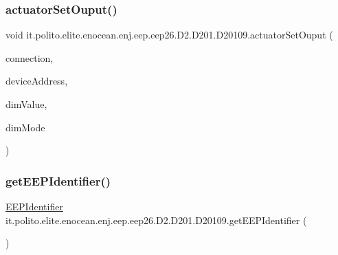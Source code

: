 \hypertarget{classit_1_1polito_1_1elite_1_1enocean_1_1enj_1_1eep_1_1eep26_1_1_d2_1_1_d201_1_1_d20109_a098e695e37eff327a11a08085113d75c}{}\label{classit_1_1polito_1_1elite_1_1enocean_1_1enj_1_1eep_1_1eep26_1_1_d2_1_1_d201_1_1_d20109_a098e695e37eff327a11a08085113d75c} 
\subsubsection{\texorpdfstring{actuator\+Set\+Ouput()}{actuatorSetOuput()}\hspace{0.1cm}{\footnotesize\ttfamily [2/2]}}
{\footnotesize\ttfamily void it.\+polito.\+elite.\+enocean.\+enj.\+eep.\+eep26.\+D2.\+D201.\+D20109.\+actuator\+Set\+Ouput (\begin{DoxyParamCaption}\item[{\hyperlink{classit_1_1polito_1_1elite_1_1enocean_1_1enj_1_1communication_1_1_en_j_connection}{En\+J\+Connection}}]{connection,  }\item[{byte \mbox{[}$\,$\mbox{]}}]{device\+Address,  }\item[{int}]{dim\+Value,  }\item[{\hyperlink{enumit_1_1polito_1_1elite_1_1enocean_1_1enj_1_1eep_1_1eep26_1_1_d2_1_1_d201_1_1_d201_dim_mode}{D201\+Dim\+Mode}}]{dim\+Mode }\end{DoxyParamCaption})}

\hypertarget{classit_1_1polito_1_1elite_1_1enocean_1_1enj_1_1eep_1_1eep26_1_1_d2_1_1_d201_1_1_d20109_a86335aedb1187d18792b80ef8c55bad7}{}\label{classit_1_1polito_1_1elite_1_1enocean_1_1enj_1_1eep_1_1eep26_1_1_d2_1_1_d201_1_1_d20109_a86335aedb1187d18792b80ef8c55bad7} 
\subsubsection{\texorpdfstring{get\+E\+E\+P\+Identifier()}{getEEPIdentifier()}}
{\footnotesize\ttfamily \hyperlink{classit_1_1polito_1_1elite_1_1enocean_1_1enj_1_1eep_1_1_e_e_p_identifier}{E\+E\+P\+Identifier} it.\+polito.\+elite.\+enocean.\+enj.\+eep.\+eep26.\+D2.\+D201.\+D20109.\+get\+E\+E\+P\+Identifier (\begin{DoxyParamCaption}{ }\end{DoxyParamCaption})}



